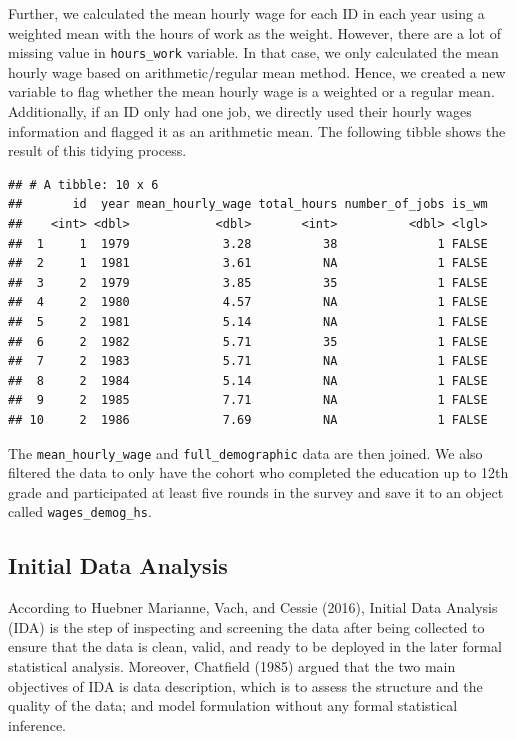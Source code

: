 \documentclass{article}
\begin{document}
Further, we calculated the mean hourly wage for each ID in each year using a weighted mean with the hours of work as the weight. However, there are a lot of missing value in \texttt{hours\_work} variable. In that case, we only calculated the mean hourly wage based on arithmetic/regular mean method. Hence, we created a new variable to flag whether the mean hourly wage is a weighted or a regular mean. Additionally, if an ID only had one job, we directly used their hourly wages information and flagged it as an arithmetic mean. The following tibble shows the result of this tidying process.

\begin{verbatim}
## # A tibble: 10 x 6
##       id  year mean_hourly_wage total_hours number_of_jobs is_wm
##    <int> <dbl>            <dbl>       <int>          <dbl> <lgl>
##  1     1  1979             3.28          38              1 FALSE
##  2     1  1981             3.61          NA              1 FALSE
##  3     2  1979             3.85          35              1 FALSE
##  4     2  1980             4.57          NA              1 FALSE
##  5     2  1981             5.14          NA              1 FALSE
##  6     2  1982             5.71          35              1 FALSE
##  7     2  1983             5.71          NA              1 FALSE
##  8     2  1984             5.14          NA              1 FALSE
##  9     2  1985             7.71          NA              1 FALSE
## 10     2  1986             7.69          NA              1 FALSE
\end{verbatim}

The \texttt{mean\_hourly\_wage} and \texttt{full\_demographic} data are then joined. We also filtered the data to only have the cohort who completed the education up to 12th grade and participated at least five rounds in the survey and save it to an object called \texttt{wages\_demog\_hs}.

\hypertarget{initial-data-analysis}{%
\subsection{Initial Data Analysis}\label{initial-data-analysis}}

According to Huebner Marianne, Vach, and Cessie (2016), Initial Data Analysis (IDA) is the step of inspecting and screening the data after being collected to ensure that the data is clean, valid, and ready to be deployed in the later formal statistical analysis. Moreover, Chatfield (1985) argued that the two main objectives of IDA is data description, which is to assess the structure and the quality of the data; and model formulation without any formal statistical inference.
\end{document}
